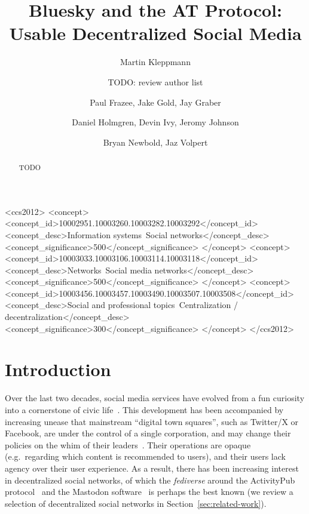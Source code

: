 \documentclass[sigconf,review]{acmart}
\begin{document}
\title{Bluesky and the AT Protocol: Usable Decentralized Social Media}
\author{Martin Kleppmann}

\author{TODO: review author list}
\author{Paul Frazee, Jake Gold, Jay Graber}
\author{Daniel Holmgren, Devin Ivy, Jeromy Johnson}
\author{Bryan Newbold, Jaz Volpert}

\begin{abstract}
TODO
\end{abstract}

\begin{CCSXML}
<ccs2012>
   <concept>
       <concept_id>10002951.10003260.10003282.10003292</concept_id>
       <concept_desc>Information systems~Social networks</concept_desc>
       <concept_significance>500</concept_significance>
   </concept>
   <concept>
       <concept_id>10003033.10003106.10003114.10003118</concept_id>
       <concept_desc>Networks~Social media networks</concept_desc>
       <concept_significance>500</concept_significance>
   </concept>
   <concept>
       <concept_id>10003456.10003457.10003490.10003507.10003508</concept_id>
       <concept_desc>Social and professional topics~Centralization / decentralization</concept_desc>
       <concept_significance>300</concept_significance>
   </concept>
 </ccs2012>
\end{CCSXML}


\maketitle

\section{Introduction}

Over the last two decades, social media services have evolved from a fun curiosity into a cornerstone of civic life~\cite{Barabas:2017}.
This development has been accompanied by increasing unease that mainstream ``digital town squares'', such as Twitter/X or Facebook, are under the control of a single corporation, and may change their policies on the whim of their leaders~\cite{Yeung:2023}.
Their operations are opaque (e.g.\ regarding which content is recommended to users), and their users lack agency over their user experience.
As a result, there has been increasing interest in decentralized social networks, of which the \emph{fediverse} around the ActivityPub protocol~\cite{ActivityPub} and the Mastodon software~\cite{Mastodon} is perhaps the best known (we review a selection of decentralized social networks in Section~\ref{sec:related-work}).
\end{document}
